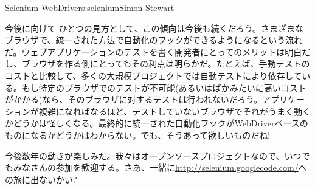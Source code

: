 \begin{aosachapter}{Selenium WebDriver}{s:selenium}{Simon Stewart}
\begin{aosasect1}{今後に向けて}
ひとつの見方として、この傾向は今後も続くだろう。さまざまなブラウザで、統一された方法で自動化のフックができるようになるという流れだ。ウェブアプリケーションのテストを書く開発者にとってのメリットは明白だし、ブラウザを作る側にとってもその利点は明らかだ。たとえば、手動テストのコストと比較して、多くの大規模プロジェクトでは自動テストにより依存している。もし特定のブラウザでのテストが不可能(あるいはばかみたいに高いコストがかかる)なら、そのブラウザに対するテストは行われないだろう。アプリケーションが複雑になればなるほど、テストしていないブラウザでそれがうまく動くかどうかは怪しくなる。最終的に統一された自動化フックがWebDriverベースのものになるかどうかはわからない。でも、そうあって欲しいものだね!

今後数年の動きが楽しみだ。我々はオープンソースプロジェクトなので、いつでもみなさんの参加を歓迎する。さあ、一緒に\url{http://selenium.googlecode.com/}への旅に出ないかい?

\end{aosasect1}

\end{aosachapter}


